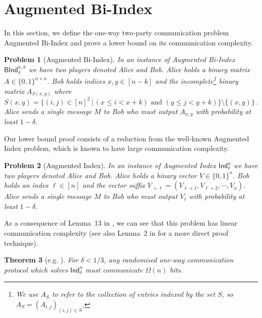 \documentclass[10pt,a4paper]{article}
\newtheorem{theorem}{Theorem}
\newtheorem{problem}[theorem]{Problem}
\newcommand{\given}{\,|\,}
\begin{document}
\setcounter{section}{1}
\setcounter{figure}{1}
\section{Augmented Bi-Index} \label{sec:aug-bi-index}
In this section, we define the one-way two-party communication problem \textsf{Augmented Bi-Index} and prove a
lower bound on its communication complexity. 

\begin{problem}[\textsf{Augmented Bi-Index}]
    In an instance of {\em \textsf{Augmented Bi-Index}} {\em $\textsf{BInd}^{n,k}_\delta$} we have two players denoted Alice and Bob.
    Alice holds a binary matrix $A \in \lbrace 0,1 \rbrace^{n \times n}$. Bob holds indices $x, y \in [n-k]$ and the incomplete\footnote{We use $A_S$ to refer to the collection of entries indexed by the set $S$, so $A_S = (A_{i,j})_{(i,j)\in S}$.} binary matrix $A_{S(x,y)}$ where
    \[
        S(x,y) = \{ (i,j) \in [n]^2 \given (x \leq i < x + k) \text{ and } (y \leq j < y + k) \} \setminus \{ (x,y) \} \ .
    \]    
    Alice sends a single message $M$ to Bob who must output $A_{x, y}$ with probability at least $1-\delta$.
\end{problem}

Our lower bound proof consists of a reduction from the well-known \textsf{Augmented Index} problem, which is known to 
have large communication complexity.



%

\begin{problem}[\textsf{Augmented Index}]
    In an instance of {\em \textsf{Augmented Index}} {\em $\textsf{Ind}^{n}_\delta$} we have two players denoted Alice and Bob.
    Alice holds a binary vector $V \in \lbrace 0,1 \rbrace^n$. Bob holds an index $\ell \in [n]$ and the vector suffix $V_{>\ell} = (V_{\ell+1}, V_{\ell+2}, \cdots, V_n)$. 
    Alice sends a single message $M$ to Bob who must output $V_\ell$ with probability at least $1-\delta$.
\end{problem}

As a consequence of Lemma~13 in \cite{mnsw98}, we can see that this problem has linear communication complexity (see also Lemma~2 in \cite{bjkk04} for a more direct proof technique).

\begin{theorem}[e.g. \cite{mnsw98}]\label{thm:augind-lower}
    For $\delta < 1/3$, any randomised one-way communication protocol which solves $\textsf{Ind}^{n}_\delta$ must communicate $\Omega(n)$ bits.
\end{theorem}
\end{document}
